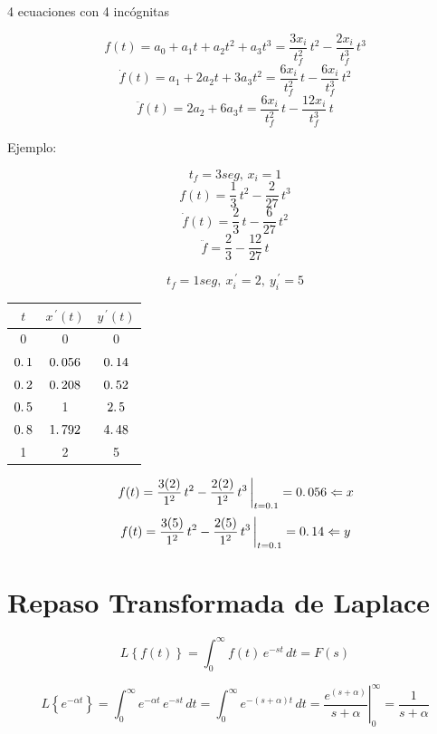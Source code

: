 4 ecuaciones con 4 incógnitas

$$f(t) = a_{0} + a_{1}t + a_{2}t^{2} + a_{3}t^{3} = \dfrac{3x_{i}}{t_{f}^{2}}\,t^{2} - \dfrac{2x_{i}}{t_{f}^{3}}\,t^{3}$$
$$\dot{f}(t) = a_{1} + 2a_{2}t + 3a_{3}t^2 = \dfrac{6x_{i}}{t_{f}^2}\,t - \dfrac{6x_{i}}{t_{f}^3}\, t^2$$
$$\ddot{f} (t) = 2a_{2} + 6a_{3}t = \dfrac{6x_{i}}{t_{f}^2}\,t - \dfrac{12x_{i}}{t_{f}^3}\, t$$

Ejemplo:

$$t_{f} = 3 seg,\, x_{i} = 1$$
$$f(t) = \dfrac{1}{3}\,t^2 - \dfrac{2}{27}\,t^3$$
$$\dot{f}(t) = \dfrac{2}{3}\, t - \dfrac{6}{27}\,t^2$$
$$\ddot{f} = \dfrac{2}{3} - \dfrac{12}{27}\, t$$


$$t_{f} = 1seg,\: x_{i}^{\,\prime} = 2,\: y_{i}^{\,\prime} = 5$$


\begin{table}[h!]
	\centering
	\begin{tabular}{c|c|c}
		$t$ & $x^{\,\prime} (t)$ & $y^{\,\prime}(t)$\\\hline
		0 & 0 & 0 \\
		$0\ldotp1$ & $0\ldotp056$ & $0\ldotp14$ \\
		$0\ldotp2$ & $0\ldotp208$ & $0\ldotp52$ \\
		$0\ldotp5$ & 1 & $2\ldotp5$ \\
		$0\ldotp8$ & $1\ldotp792$ & $4\ldotp48$ \\
		1 & 2 & 5
	\end{tabular}
\end{table}


$$\left. f(t) = \dfrac{3(2)}{1^2}\, t^2 - \dfrac{2(2)}{1^2}\, t^3\, \right|_{t = 0\ldotp1} = 0\ldotp056 \Leftarrow x$$
$$\left. f(t) = \dfrac{3(5)}{1^2}\, t^2 - \dfrac{2(5)}{1^2}\, t^3\, \right|_{t = 0\ldotp1} = 0\ldotp14 \Leftarrow y$$



\section{Repaso Transformada de Laplace}

$$L\left\lbrace f(t) \right\rbrace = \displaystyle \int_{0}^{\infty} f(t)\,e^{-st}\, dt = F(s)$$

$$\left. L\left\lbrace e^{-\alpha t} \right\rbrace = \displaystyle \int_{0}^{\infty} e^{-\alpha t}\,e^{-st}\, dt = \displaystyle \int_{0}^{\infty} e^{-(s + \alpha)t}\, dt = \dfrac{e^{(s + \alpha)}}{s + \alpha}\right|_{0}^{\infty} = \dfrac{1}{s + \alpha}$$

